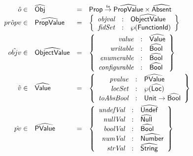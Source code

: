\[\begin{array}{rlcl}
\hat{o} \in & \aObj & = & \SF{Prop} \finto \abs{PropValue} \times \abs{Absent} \\
\hat{propv} \in & \abs{PropValue} & = & 
\left\{ \begin{array}{rcl}
\emph{objval} & : & \abs{ObjectValue} \\
\emph{fidSet} & : & \powerset{\fid} \\
\end{array} \right\} \vspace{1mm}\\

\hat{objv} \in & \abs{ObjectValue} & = & 
\left\{ \begin{array}{rcl}
\emph{value} & : & \aValue \\
\emph{writable} & : & \abs{Bool} \\
\emph{enumerable} & : & \abs{Bool} \\
\emph{configurable} & : & \abs{Bool} \\
\end{array} \right\} \vspace{1mm}\\

\hat{v} \in & \aValue & = & 
\left\{ \begin{array}{rcl}
\emph{pvalue} & : & \abs{PValue} \\
\emph{locSet} & : & \powerset{\aLoc} \\
\emph{toAbsBool} & : & \SF{Unit} \rightarrow \abs{Bool}
\end{array} \right\} \vspace{1mm}\\

\hat{pv}\in & \abs{PValue} & = & 
\left\{ \begin{array}{rcl}
\emph{undefVal} & : & \abs{Undef} \\
\emph{nullVal} & : & \abs{Null} \\
\emph{boolVal} & : & \abs{Bool} \\
\emph{numVal} & : & \abs{Number} \\
\emph{strVal} & : & \abs{String} \\
\end{array} \right\} \vspace{1mm}\\


\end{array}\]
